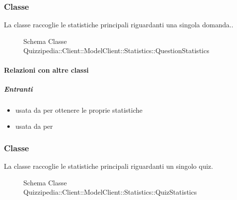 \subsubsection{Classe }
La classe raccoglie le statistiche principali riguardanti una singola domanda..
\begin{figure}[H]
\centering
\noindent{}
\caption[Schema Classe QuestionStatistics]{Schema Classe Quizzipedia::Client::ModelClient::Statistics::QuestionStatistics}
\end{figure}
\paragraph{Relazioni con altre classi}
\subparagraph{Entranti}
\begin{itemize}
\item usata da  per ottenere le proprie statistiche
\item usata da  per 
\end{itemize}
\subsubsection{Classe }
La classe raccoglie le statistiche principali riguardanti un singolo quiz.
\begin{figure}[H]
\centering
\noindent{}
\caption[Schema Classe QuizStatistics]{Schema Classe Quizzipedia::Client::ModelClient::Statistics::QuizStatistics}
\end{figure}
